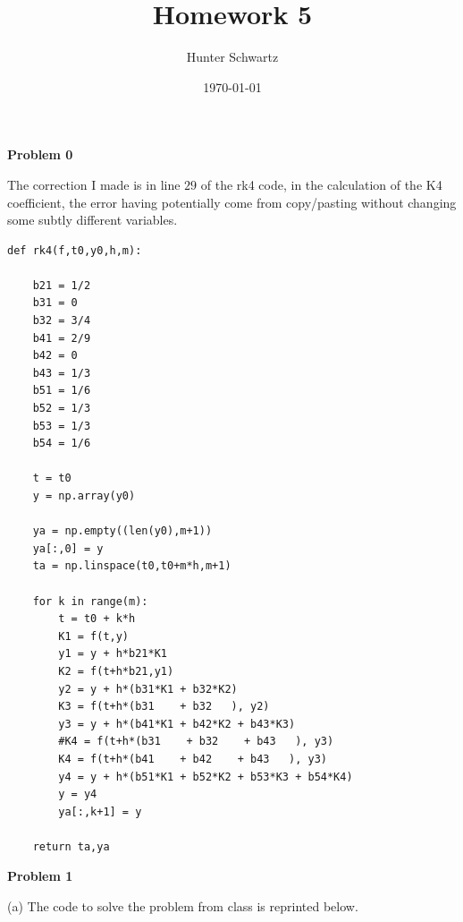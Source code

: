 \documentclass[12pt]{article}
\begin{document}
\title{Homework 5}
\date{\today}
\author{Hunter Schwartz}
\maketitle


\textbf{Problem 0}

The correction I made is in line $29$ of the rk4 code, in the calculation of the K4 coefficient, the error having potentially come from copy/pasting without changing some subtly different variables.

\begin{verbatim}
def rk4(f,t0,y0,h,m):

    b21 = 1/2
    b31 = 0
    b32 = 3/4
    b41 = 2/9
    b42 = 0
    b43 = 1/3
    b51 = 1/6
    b52 = 1/3
    b53 = 1/3
    b54 = 1/6
        
    t = t0
    y = np.array(y0)

    ya = np.empty((len(y0),m+1))
    ya[:,0] = y
    ta = np.linspace(t0,t0+m*h,m+1)
     
    for k in range(m):
        t = t0 + k*h
        K1 = f(t,y)  
        y1 = y + h*b21*K1
        K2 = f(t+h*b21,y1)
        y2 = y + h*(b31*K1 + b32*K2)
        K3 = f(t+h*(b31    + b32   ), y2)
        y3 = y + h*(b41*K1 + b42*K2 + b43*K3)
        #K4 = f(t+h*(b31    + b32    + b43   ), y3)
        K4 = f(t+h*(b41    + b42    + b43   ), y3)
        y4 = y + h*(b51*K1 + b52*K2 + b53*K3 + b54*K4)
        y = y4
        ya[:,k+1] = y
        
    return ta,ya
\end{verbatim}

\newpage

\textbf{Problem 1}

(a) The code to solve the problem from class is reprinted below. 
\end{document}
